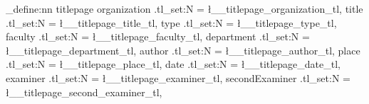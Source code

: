 \def\hlmint{\fontfamily{lmss}\fontsize{19pt}{19pt}\fontseries{b}\color{fh-mint}\selectfont}
\def\hlAbold{\fontfamily{lmss}\fontsize{14pt}{30pt}\fontseries{b}\selectfont}
\def\hlAnormal{\fontfamily{lmss}\fontsize{14pt}{14pt}\fontseries{n}\selectfont}

\newcommand{\showlogo}{


    \begin{picture}(0pt,0pt)(2cm,-2cm)
        \put(18cm,-3cm){\texttt{[image: fh-logo-right]}}
    \end{picture}
}

\ExplSyntaxOn
\keys_define:nn { titlepage }
{
    organization .tl_set:N  = \l__titlepage_organization_tl,
    title  .tl_set:N  = \l__titlepage_title_tl,
    type .tl_set:N  = \l__titlepage_type_tl,
    faculty .tl_set:N  = \l__titlepage_faculty_tl,
    department .tl_set:N  = \l__titlepage_department_tl,
    author  .tl_set:N  = \l__titlepage_author_tl,
    place  .tl_set:N  = \l__titlepage_place_tl,
    date .tl_set:N  = \l__titlepage_date_tl,
    examiner .tl_set:N  = \l__titlepage_examiner_tl,
    secondExaminer .tl_set:N  = \l__titlepage_second_examiner_tl,
}

